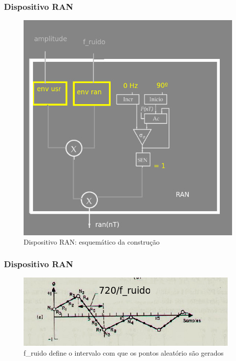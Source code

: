 \documentclass{beamer}
\begin{document}
\begin{frame}
 \frametitle{Dispositivo RAN}
 \begin{figure}
  \includegraphics[scale=0.3]{./images/RAN.png}
  \caption{Dispositivo RAN: esquemático da construção}
   \end{figure}
\end{frame}

\begin{frame}
 \frametitle{Dispositivo RAN}
 \begin{figure}
  \includegraphics[scale=1.0]{./images/f_ruido.png}
  \caption{f\_ruido define o intervalo com que os pontos aleatório são gerados}
   \end{figure}
\end{frame}
\end{document}
